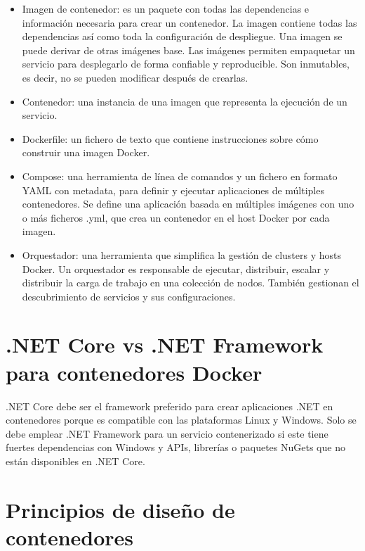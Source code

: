 \documentclass[11pt,a4paper]{article}
\begin{document}
\begin{itemize}

\item Imagen de contenedor: es un paquete con todas las dependencias e información necesaria para crear un contenedor. La imagen contiene todas las dependencias así como toda la configuración de despliegue. Una imagen se puede derivar de otras imágenes base. Las imágenes permiten empaquetar un servicio para desplegarlo de forma confiable y reproducible. Son inmutables, es decir, no se pueden modificar después de crearlas.

\item Contenedor: una instancia de una imagen que representa la ejecución de un servicio.

\item Dockerfile: un fichero de texto que contiene instrucciones sobre cómo construir una imagen Docker.

\item Compose: una herramienta de línea de comandos y un fichero en formato YAML con metadata, para definir y ejecutar aplicaciones de múltiples contenedores. Se define una aplicación basada en múltiples imágenes con uno o más ficheros .yml, que crea un contenedor en el host Docker por cada imagen.

\item Orquestador: una herramienta que simplifica la gestión de clusters y hosts Docker. Un orquestador es responsable de ejecutar, distribuir, escalar y distribuir la carga de trabajo en una colección de nodos. También gestionan el descubrimiento de servicios y sus configuraciones.

\end{itemize}

\section{.NET Core vs .NET Framework para contenedores Docker}

.NET Core debe ser el framework preferido para crear aplicaciones .NET en contenedores porque es compatible con las plataformas Linux y Windows. Solo se debe emplear .NET Framework para un servicio contenerizado si este tiene fuertes dependencias con Windows y APIs, librerías o paquetes NuGets que no están disponibles en .NET Core.

\section{Principios de diseño de contenedores}
\end{document}
